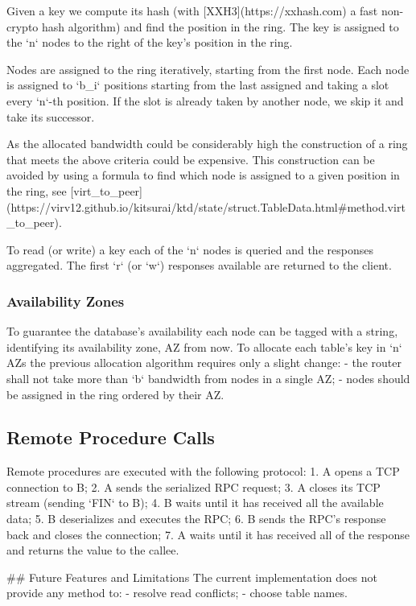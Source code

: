 Given a key we compute its hash (with [XXH3](https://xxhash.com) a fast non-crypto hash algorithm)
 and find the position in the ring.
The key is assigned to the `n` nodes to the right of the key's position in the ring.

Nodes are assigned to the ring iteratively, starting from the first node.
Each node is assigned to `b_i` positions starting from the last assigned and taking a slot every `n`-th position.
If the slot is already taken by another node, we skip it and take its successor.

As the allocated bandwidth could be considerably high the construction of a ring 
 that meets the above criteria could be expensive.
This construction can be avoided by using a formula
 to find which node is assigned to a given position in the ring,
 see [virt_to_peer](https://virv12.github.io/kitsurai/ktd/state/struct.TableData.html#method.virt_to_peer).

To read (or write) a key each of the `n` nodes is queried and the responses aggregated.
The first `r` (or `w`) responses available are returned to the client.

\subsubsection{Availability Zones}
\label{subsubsec:availability-zones}

To guarantee the database's availability each node can be tagged with a string, 
 identifying its availability zone, AZ from now.
To allocate each table's key in `n` AZs the previous allocation algorithm requires only a slight change:
- the router shall not take more than `b` bandwidth from nodes in a single AZ;
- nodes should be assigned in the ring ordered by their AZ.

\subsection{Remote Procedure Calls}
\label{subsec:rpc}

Remote procedures are executed with the following protocol:
1. A opens a TCP connection to B;
2. A sends the serialized RPC request;
3. A closes its TCP stream (sending `FIN` to B);
4. B waits until it has received all the available data;
5. B deserializes and executes the RPC;
6. B sends the RPC's response back and closes the connection;
7. A waits until it has received all of the response and returns the value to the callee.

## Future Features and Limitations
The current implementation does not provide any method to:
- resolve read conflicts;
- choose table names.

